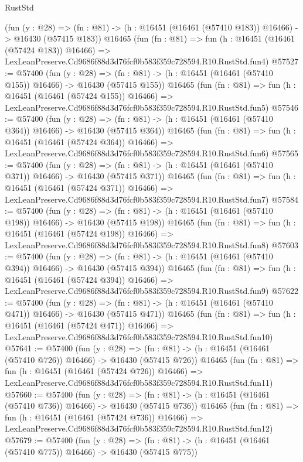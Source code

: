 \begin{lexlean}{RustStd}
\begin{coremodule}
    (fun (y : @28) =>
    (fn : @81) -> (h : @16451 (@16461 (@57410 @183)) @16466) -> @16430 (@57415 @183))
    @16465
    (fun (fn : @81) =>
    fun (h : @16451 (@16461 (@57424 @183)) @16466) =>
    LexLeanPreserve.Cd9686f88d3d76fcf0b583f359c728594.R10.RustStd.fun4)
@57527 := @57400
    (fun (y : @28) =>
    (fn : @81) -> (h : @16451 (@16461 (@57410 @155)) @16466) -> @16430 (@57415 @155))
    @16465
    (fun (fn : @81) =>
    fun (h : @16451 (@16461 (@57424 @155)) @16466) =>
    LexLeanPreserve.Cd9686f88d3d76fcf0b583f359c728594.R10.RustStd.fun5)
@57546 := @57400
    (fun (y : @28) =>
    (fn : @81) -> (h : @16451 (@16461 (@57410 @364)) @16466) -> @16430 (@57415 @364))
    @16465
    (fun (fn : @81) =>
    fun (h : @16451 (@16461 (@57424 @364)) @16466) =>
    LexLeanPreserve.Cd9686f88d3d76fcf0b583f359c728594.R10.RustStd.fun6)
@57565 := @57400
    (fun (y : @28) =>
    (fn : @81) -> (h : @16451 (@16461 (@57410 @371)) @16466) -> @16430 (@57415 @371))
    @16465
    (fun (fn : @81) =>
    fun (h : @16451 (@16461 (@57424 @371)) @16466) =>
    LexLeanPreserve.Cd9686f88d3d76fcf0b583f359c728594.R10.RustStd.fun7)
@57584 := @57400
    (fun (y : @28) =>
    (fn : @81) -> (h : @16451 (@16461 (@57410 @198)) @16466) -> @16430 (@57415 @198))
    @16465
    (fun (fn : @81) =>
    fun (h : @16451 (@16461 (@57424 @198)) @16466) =>
    LexLeanPreserve.Cd9686f88d3d76fcf0b583f359c728594.R10.RustStd.fun8)
@57603 := @57400
    (fun (y : @28) =>
    (fn : @81) -> (h : @16451 (@16461 (@57410 @394)) @16466) -> @16430 (@57415 @394))
    @16465
    (fun (fn : @81) =>
    fun (h : @16451 (@16461 (@57424 @394)) @16466) =>
    LexLeanPreserve.Cd9686f88d3d76fcf0b583f359c728594.R10.RustStd.fun9)
@57622 := @57400
    (fun (y : @28) =>
    (fn : @81) -> (h : @16451 (@16461 (@57410 @471)) @16466) -> @16430 (@57415 @471))
    @16465
    (fun (fn : @81) =>
    fun (h : @16451 (@16461 (@57424 @471)) @16466) =>
    LexLeanPreserve.Cd9686f88d3d76fcf0b583f359c728594.R10.RustStd.fun10)
@57641 := @57400
    (fun (y : @28) =>
    (fn : @81) -> (h : @16451 (@16461 (@57410 @726)) @16466) -> @16430 (@57415 @726))
    @16465
    (fun (fn : @81) =>
    fun (h : @16451 (@16461 (@57424 @726)) @16466) =>
    LexLeanPreserve.Cd9686f88d3d76fcf0b583f359c728594.R10.RustStd.fun11)
@57660 := @57400
    (fun (y : @28) =>
    (fn : @81) -> (h : @16451 (@16461 (@57410 @736)) @16466) -> @16430 (@57415 @736))
    @16465
    (fun (fn : @81) =>
    fun (h : @16451 (@16461 (@57424 @736)) @16466) =>
    LexLeanPreserve.Cd9686f88d3d76fcf0b583f359c728594.R10.RustStd.fun12)
@57679 := @57400
    (fun (y : @28) =>
    (fn : @81) -> (h : @16451 (@16461 (@57410 @775)) @16466) -> @16430 (@57415 @775))

\end{coremodule}
\end{lexlean}
